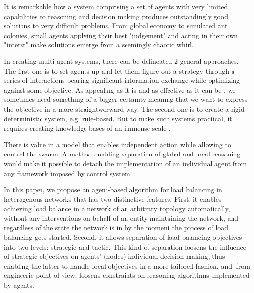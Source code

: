 It is remarkable how a system comprising a set of agents with very limited capabilities to reasoning and decision making produces outstandingly good solutions to very difficult problems.
From global economy to simulated ant colonies, small agents applying their best "judgement" and acting in their own "interst" make solutions emerge from a seemingly chaotic whirl.

In creating multi agent systems, there can be delineated 2 general approaches.
The first one is to set agents up and let them figure out a strategy through a series of interactions bearing significant information exchange while optimizing against some objective.
As appealing as it is and as effective as it can be \cite{dorigo-2006}, we sometimes need something of a bigger certainty meaning that we want to express the objective in a more straightworward way.
The second one is to create a rigid deterministic system, e.g. rule-based.
But to make such systems practical, it requires creating knowledge bases of an immense scale \cite{lenat-2022}.

There is value in a model that enables independent action while allowing to control the swarm.
A method enabling separation of global and local reasoning would make it possible to detach the implementation of an individual agent from any framework imposed by control system.

In this paper, we propose an agent-based algorithm for load balancing in heterogenous networks that has two distinctive features.
First, it enables achieving load balance in a network of an arbitrary topology automatically, without any interventions on behalf of an entity maintaining the network, and regardless of the state the network is in by the moment the process of load balancing gets started.
Second, it allows separation of load balancing objectives into two levels: strategic and tactic.
This kind of separation loosens the influence of strategic objectives on  agents' (nodes) individual decision making, thus enabling the latter to handle local objectives in a more tailored fashion, and, from engineeric point of view, loosens constraints on reasoning algorithms implemented by agents.
